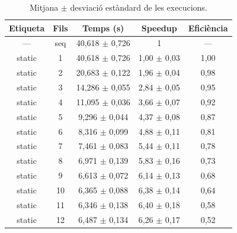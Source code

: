 \begin{table}[H]
\centering
\begin{tabular}{|c|c|c|c|c|}
\hline
\textbf{Etiqueta} & \textbf{Fils} & \textbf{Temps (s)} & \textbf{Speedup} & \textbf{Eficiència} \\ \hline
--- & seq & 40,618 $\pm$ 0,726 & 1 & --- \\ \hline
static & 1 & 40,618 $\pm$ 0,726 & 1,00 $\pm$ 0,03 & 1,00 \\ \hline
static & 2 & 20,683 $\pm$ 0,122 & 1,96 $\pm$ 0,04 & 0,98 \\ \hline
static & 3 & 14,286 $\pm$ 0,055 & 2,84 $\pm$ 0,05 & 0,95 \\ \hline
static & 4 & 11,095 $\pm$ 0,036 & 3,66 $\pm$ 0,07 & 0,92 \\ \hline
static & 5 & 9,296 $\pm$ 0,044 & 4,37 $\pm$ 0,08 & 0,87 \\ \hline
static & 6 & 8,316 $\pm$ 0,099 & 4,88 $\pm$ 0,11 & 0,81 \\ \hline
static & 7 & 7,461 $\pm$ 0,083 & 5,44 $\pm$ 0,11 & 0,78 \\ \hline
static & 8 & 6,971 $\pm$ 0,139 & 5,83 $\pm$ 0,16 & 0,73 \\ \hline
static & 9 & 6,613 $\pm$ 0,072 & 6,14 $\pm$ 0,13 & 0,68 \\ \hline
static & 10 & 6,365 $\pm$ 0,088 & 6,38 $\pm$ 0,14 & 0,64 \\ \hline
static & 11 & 6,346 $\pm$ 0,138 & 6,40 $\pm$ 0,18 & 0,58 \\ \hline
static & 12 & 6,487 $\pm$ 0,134 & 6,26 $\pm$ 0,17 & 0,52 \\ \hline
\end{tabular}
\caption{Mitjana $\pm$ desviació estàndard de les execucions.}
\label{tab:resultats}
\end{table}
